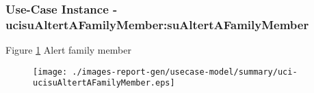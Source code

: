 
	\subsubsection{Use-Case Instance - ucisuAltertAFamilyMember:suAltertAFamilyMember}
	

	
	Figure \ref{fig:lu.uni.lassy.excalibur.g01.specification-RE-UC-uci-ucisuAltertAFamilyMember}
	Alert family member
	
	\begin{figure}[htbp]
	\begin{center}
	
	\texttt{[image: ./images-report-gen/usecase-model/summary/uci-ucisuAltertAFamilyMember.eps]}
	\end{center}
	\caption[lu.uni.lassy.excalibur.g01.specification Sequence Diagram: uci-ucisuAltertAFamilyMember]{}
	\label{fig:lu.uni.lassy.excalibur.g01.specification-RE-UC-uci-ucisuAltertAFamilyMember}
	\end{figure}
	\vspace{0.5cm}
